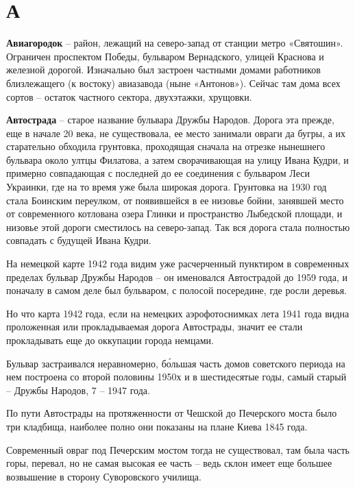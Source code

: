 \chapter*{А}


\textbf{Авиагородок} – район, лежащий на северо-запад от станции метро «Святошин». Ограничен проспектом Победы, бульваром Вернадского, улицей Краснова и железной дорогой. Изначально был застроен частными домами работников близлежащего (к востоку) авиазавода (ныне «Антонов»). Сейчас там дома всех сортов – остаток частного сектора, двухэтажки, хрущовки.\\

\medskip

\textbf{Автострада} – старое название бульвара Дру\-жбы Народов. Дорога эта прежде, еще в начале 20 века, не существовала, ее место занимали овраги да бугры, а их старательно обходила грунтовка, проходящая сначала на отрезке нынешнего бульвара около ултцы Филатова, а затем сворачивающая на улицу Ивана Кудри, и примерно совпадающая с последней до ее соединения с бульваром Леси Украинки, где на то время уже была широкая дорога. Грунтовка на 1930 год стала Боинским переулком, от появившейся в ее низовье бойни, занявшей место от современного котлована озера Глинки и пространство Лыбедской площади, и низовье этой дороги сместилось на северо-запад. Так вся дорога стала полностью совпадать с будущей Ивана Кудри.

На немецкой карте 1942 года видим уже расчерченный пунктиром в современных пределах бульвар Дружбы Народов – он именовался Автострадой до 1959 года, и поначалу в самом деле был бульваром, с полосой посередине, где росли деревья.

Но что карта 1942 года, если на немецких аэрофотоснимках лета 1941 года видна проложенная или прокладываемая дорога Автострады, значит ее стали прокладывать еще до оккупации города немцами.

Бульвар застраивался неравномерно, б\'ольшая часть домов советского периода на нем построена со второй половины 1950х и в шестидесятые годы, самый старый – Дружбы Народов, 7 – 1947 года.

По пути Автострады на протяженности от Чешской до Печерского моста было три кладбища, наиболее полно они показаны на плане Киева 1845 года.

Современный овраг под Печерским мостом тогда не существовал, там была часть горы, перевал, но не самая высокая ее часть – ведь склон имеет еще большее возвышение в сторону Суворовского училища.

